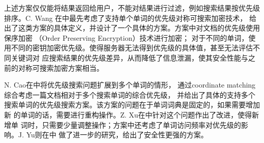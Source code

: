 上述方案仅仅能将结果返回给用户，不能对结果进行过滤，例如搜索结果按优先级排序。C. Wang
在\cite{wang2010secure}\cite{wang2012enabling}中最先考虑了支持单个单词的优先级对称可搜索加密技术，
给出了这类方案的具体定义，并设计了一个具体的方案。方案中对文档的优先级使用保序加密
（Order Preserving Encryption）\cite{boldyreva2011order}技术进行加密；
对于不同的单词，使用不同的密钥加密优先级。使得服务器无法得到优先级的具体值，甚至无法评估不同关键词对
应搜索结果的优先级差异，从而降低了信息泄漏，使其安全性能与之前的对称可搜索加密方案相当。

N. Cao在\cite{cao2014privacy}中将优先级搜索问题扩展到多个单词的情形，
通过coordinate matching\cite{witten1999managing}综合考虑一篇文档相对于多个搜索单词的综合优先级，
并给出了具体的支持多个搜索单词的优先级搜索方案。该方案的问题在于单词词典是固定的，如果需要增加新
的单词的话，需要进行重构操作。Z. Xu在\cite{xu2012efficient}中针对这个问题作出了改进，使得新增单
词时，只需要少量调整操作；方案中还考虑了单词访问频率对优先级的影响。J. Yu则在\cite{cao2014privacy}中
做了进一步的研究，给出了安全性更强的方案。

